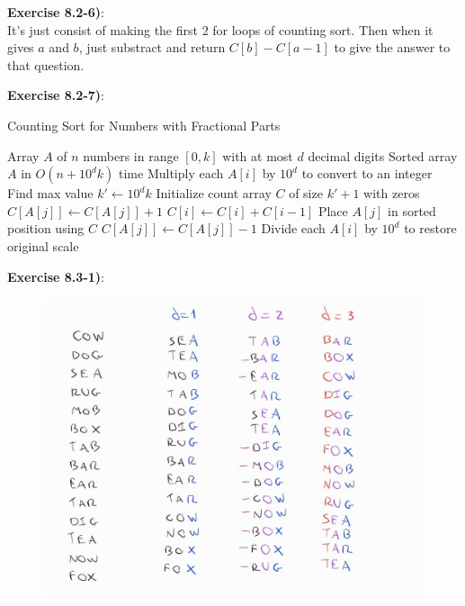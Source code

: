 \documentclass{article}
\newcounter{exercise}[section]   %
\begin{document}
\textbf{Exercise 8.2-6)}:\\
It's just consist of making the first 2 for loops of counting sort. Then when it gives 
\(a\) and \(b\), just substract and return \(C[b] - C[a - 1]\) to give the answer to that 
question.

\newpage
{}
\textbf{Exercise 8.2-7)}:\\
\begin{algorithm}
    \caption{Counting Sort for Numbers with Fractional Parts}
    \begin{algorithmic}[1]
        \Require Array $A$ of $n$ numbers in range $[0, k]$ with at most $d$ decimal digits
        \Ensure Sorted array $A$ in $O(n + 10^d k)$ time
        \State Multiply each $A[i]$ by $10^d$ to convert to an integer
        \State Find max value $k' \gets 10^d k$
        \State Initialize count array $C$ of size $k' + 1$ with zeros
        \State $C[A[j]] \gets C[A[j]] + 1$
        \EndFor
        \State $C[i] \gets C[i] + C[i-1]$
        \EndFor
        \State Place $A[j]$ in sorted position using $C$
        \State $C[A[j]] \gets C[A[j]] - 1$
        \EndFor
        \State Divide each $A[i]$ by $10^d$ to restore original scale
    \end{algorithmic}
\end{algorithm}

\textbf{Exercise 8.3-1)}:
\begin{figure}[h]
    \centering
    \includegraphics[scale=0.3]{Problem8_3_1.jpeg}
\end{figure}
\end{document}
